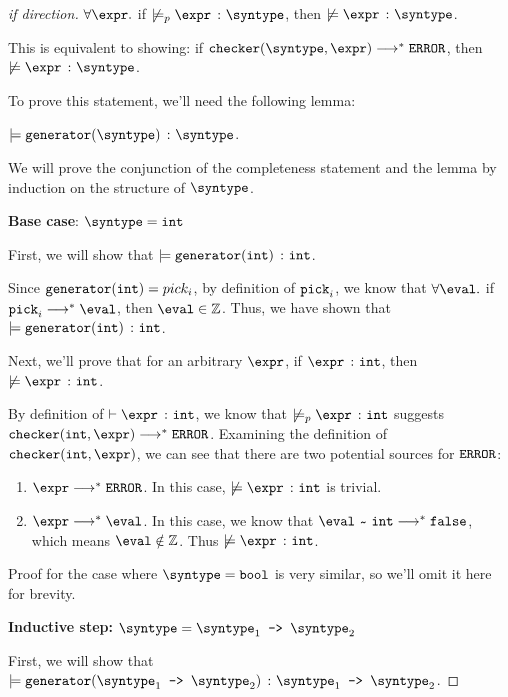 \begin{proof}[if direction]
  $\forall \expr.$ if $\not\models_p \hastype{\expr}{\syntype}$, then $\not\models \hastype{\expr}{\syntype}$.

  This is equivalent to showing: if $\mkche{\syntype}{\expr} \smallsteps[] \eerror$, then $\not\models \hastype{\expr}{\syntype}$.

  To prove this statement, we'll need the following lemma:

  \begin{lemma}
    $\models \hastype{\mkgen{\syntype}}{\syntype}$.
  \end{lemma}

  We will prove the conjunction of the completeness statement and the lemma by induction on the structure of $\syntype$.

  \textbf{Base case}: $\syntype = \tint$

  First, we will show that $\models \texttt{generator}(\texttt{int})\ \colon \texttt{int}$.
  
  Since $\texttt{generator}(\texttt{int}) = pick_i$, by definition of $\texttt{pick}_i$, we know that $\forall \eval.$ if $\pick_i \smallsteps[] \eval$, then $\eval \in \mathbb{Z}$. Thus, we have shown that $\models \texttt{generator}(\texttt{int})\ \colon \texttt{int}$.

  Next, we'll prove that for an arbitrary $\expr$, if $ \hastype{\expr}{\tint}$, then $\not\models \hastype{\expr}{\tint}$.

  By definition of $\vdash \hastype{\expr}{\tint}$, we know that $\not\models_p \hastype{\expr}{\tint}$ suggests $\mkche{\tint}{\expr} \smallsteps[] \eerror$. Examining the definition of $\mkche{\tint}{\expr}$, we can see that there are two potential sources for $\texttt{ERROR}$:
  \begin{enumerate}
    \item $\expr \smallsteps[] \eerror$. In this case, $\not\models \hastype{\expr}{\tint}$ is trivial. 
    \item $\expr \smallsteps[] \eval$. In this case, we know that $\matches{\eval}{\tint} \smallsteps[] \texttt{false}$, which means $\eval \notin \mathbb{Z}$. Thus $\not\models \hastype{\expr}{\tint}$. 
  \end{enumerate}

  Proof for the case where $\syntype = \tbool$ is very similar, so we'll omit it here for brevity.

  \textbf{Inductive step:} $\syntype = \mkfun{\syntype_1}{\syntype_2}$

  First, we will show that $\models \hastype{\mkgen{\mkfun{\syntype_1}{\syntype_2}}}{\mkfun{\syntype_1}{\syntype_2}}$.


\end{proof}
